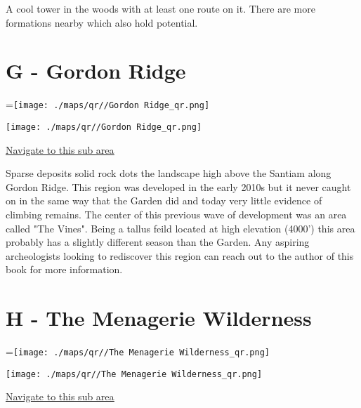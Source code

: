 \begin{multicols}{2}
A cool tower in the woods with at least one route on it. There are more formations nearby which also hold potential.\\




\vfill\null
\columnbreak

\section{G - Gordon Ridge}\label{sa:Gordon Ridge}
=\hbox{\texttt{[image: ./maps/qr//Gordon Ridge\_qr.png]}}%
\begin{center}
\texttt{[image: ./maps/qr//Gordon Ridge\_qr.png]}
\end{center}
\begin{center}
\underline{\textcolor{blue}{\href{http://maps.google.com/maps?q=44.34844,-122.34942}{Navigate to this sub area}}}
\end{center}


Sparse deposits solid rock dots the landscape high above the Santiam along Gordon Ridge. This region was developed in the early 2010s but it never caught on in the same way that the Garden did and today very little evidence of climbing remains. The center of this previous wave of development was an area called "The Vines". Being a tallus feild located at high elevation (4000') this area probably has a slightly different season than the Garden. Any aspiring archeologists looking to rediscover this region can reach out to the author of this book for more information.\\




\vfill\null
\columnbreak

\section{H - The Menagerie Wilderness}\label{sa:The Menagerie Wilderness}
=\hbox{\texttt{[image: ./maps/qr//The Menagerie Wilderness\_qr.png]}}%
\begin{center}
\texttt{[image: ./maps/qr//The Menagerie Wilderness\_qr.png]}
\end{center}
\begin{center}
\underline{\textcolor{blue}{\href{http://maps.google.com/maps?q=44.42210107163126,-122.31253942150109}{Navigate to this sub area}}}
\end{center}



\end{multicols}
